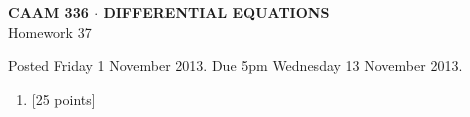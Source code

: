 \documentclass[10pt]{article}
\begin{document}
\vspace*{-5em}
\begin{center}
\large \textsf{\textbf{CAAM 336 $\cdot$ DIFFERENTIAL EQUATIONS}\\[0.5em]
Homework 37 }
\end{center}

Posted Friday 1 November 2013.  Due 5pm Wednesday 13 November 2013.

\begin{enumerate}\addtocounter{enumi}{36}
\item {[25 points]}  
\end{enumerate}
\end{document}
